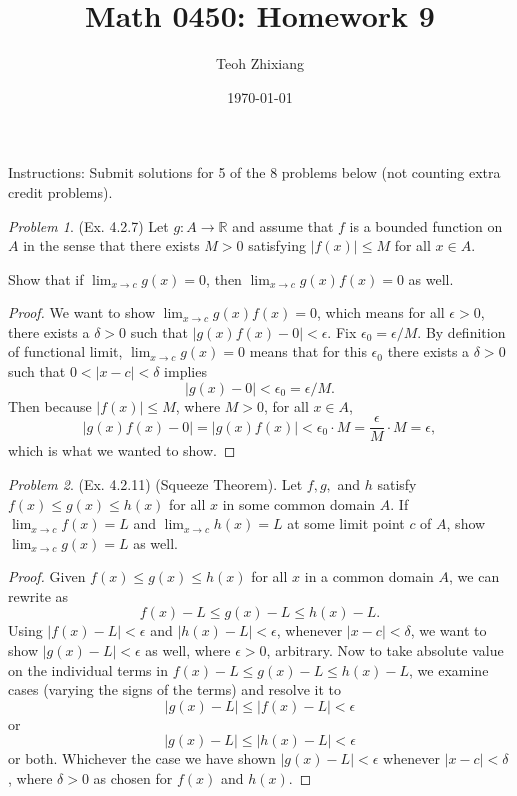 \documentclass[11pt,twoside, reqno]{amsart}
\theoremstyle{remark}
\newtheorem{Prob}{Problem}
\def\R{\mathbb R}
\begin{document}
\title{Math 0450: Homework 9}
\date{\today}
\author{Teoh Zhixiang}

\maketitle
Instructions: Submit solutions for 5 of the 8 problems below (not counting extra credit problems).

\begin{Prob}(Ex. 4.2.7) Let $g : A \to \R$ and assume that $f$ is a bounded function on $A$ in the sense that there exists $M > 0$ satisfying $|f(x)| \leq M$ for all $x \in A$.

Show that if $\lim_{x \to c}g(x) = 0$, then $\lim_{x \to c}g(x)f(x) = 0$ as well.
\end{Prob}

\begin{proof}
We want to show $\lim_{x \to c}g(x)f(x) = 0$, which means for all $\epsilon > 0$, there exists a $\delta > 0$ such that $|g(x)f(x) - 0| < \epsilon$. Fix $\epsilon_0 = \epsilon / M$. By definition of functional limit, $\lim_{x \to c}g(x) = 0$ means that for this $\epsilon_0$ there exists a $\delta > 0$ such that $0 < |x - c| < \delta$ implies 
$$
|g(x) - 0| < \epsilon_0 = \epsilon / M.
$$
Then because $|f(x)| \leq M$, where $M > 0$, for all $x \in A$,
$$
    |g(x)f(x) - 0| = |g(x)f(x)| < \epsilon_0 \cdot M = \frac{\epsilon}{M} \cdot M = \epsilon,
$$
which is what we wanted to show.

\end{proof}

\begin{Prob}(Ex. 4.2.11) (Squeeze Theorem). Let $f,g,$ and $h$ satisfy $f(x) \leq g(x) \leq h(x)$ for all $x$ in some common domain $A$. If $\lim_{x \to c}f(x) = L$ and $\lim_{x \to c}h(x) = L$ at some limit point $c$ of $A$, show $\lim_{x \to c}g(x) = L$ as well.
\end{Prob}

\begin{proof}
Given $f(x) \leq g(x) \leq h(x)$ for all $x$ in a common domain $A$, we can rewrite as
$$
    f(x) - L \leq g(x) - L \leq h(x) - L.
$$
Using $|f(x) - L| < \epsilon$ and $|h(x) - L| < \epsilon$, whenever $|x - c| < \delta$, we want to show $|g(x) - L| < \epsilon$ as well, where $\epsilon > 0$, arbitrary. Now to take absolute value on the individual terms in $f(x) - L \leq g(x) - L \leq h(x) - L$, we examine cases (varying the signs of the terms) and resolve it to
$$
    |g(x) - L| \leq |f(x) - L| < \epsilon
$$
or 
$$
    |g(x) - L| \leq |h(x) - L| < \epsilon
$$
or both. Whichever the case we have shown $|g(x) - L| < \epsilon$ whenever $|x - c| < \delta$, where $\delta > 0$ as chosen for $f(x)$ and $h(x)$.

\end{proof}
\end{document}
